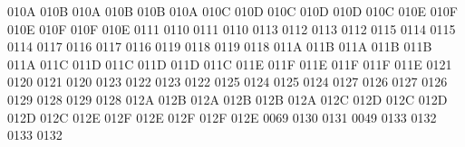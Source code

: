 \setcclcucx 010A 010B 010A %
\setcclcucx 010B 010B 010A %
\setcclcucx 010C 010D 010C %
\setcclcucx 010D 010D 010C %
\setcclcucx 010E 010F 010E %
\setcclcucx 010F 010F 010E %
 0111 0110 %
 0111 0110 %
 0113 0112 %
 0113 0112 %
 0115 0114 %
 0115 0114 %
 0117 0116 %
 0117 0116 %
 0119 0118 %
 0119 0118 %
\setcclcucx 011A 011B 011A %
\setcclcucx 011B 011B 011A %
\setcclcucx 011C 011D 011C %
\setcclcucx 011D 011D 011C %
\setcclcucx 011E 011F 011E %
\setcclcucx 011F 011F 011E %
 0121 0120 %
 0121 0120 %
 0123 0122 %
 0123 0122 %
 0125 0124 %
 0125 0124 %
 0127 0126 %
 0127 0126 %
 0129 0128 %
 0129 0128 %
\setcclcucx 012A 012B 012A %
\setcclcucx 012B 012B 012A %
\setcclcucx 012C 012D 012C %
\setcclcucx 012D 012D 012C %
\setcclcucx 012E 012F 012E %
\setcclcucx 012F 012F 012E %
 0069 0130 %
 0131 0049 %
 0133 0132 %
 0133 0132 %
